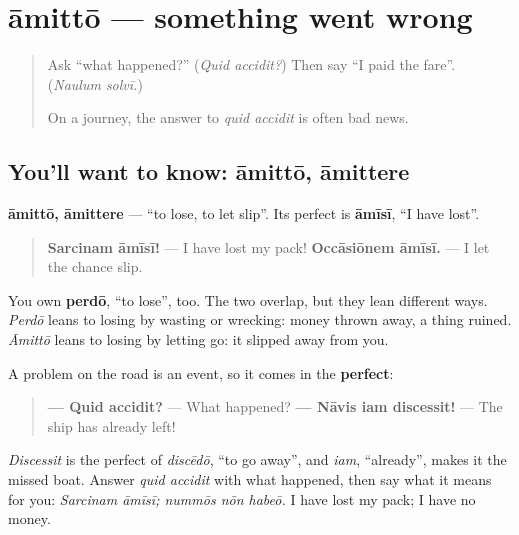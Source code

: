 \section[āmittō, āmittere]{āmittō — something went wrong}

\label{lesson:LA-C286-amitto}



\begin{quote}
Ask \textquotedblleft{}what happened?\textquotedblright{} (\emph{Quid accidit?}) Then say \textquotedblleft{}I paid the fare\textquotedblright{}. (\emph{Naulum solvī.})

On a journey, the answer to \emph{quid accidit} is often bad news.
\end{quote}

\subsection*{You'll want to know: āmittō, āmittere}
\textbf{āmittō, āmittere} — \textquotedblleft{}to lose, to let slip\textquotedblright{}. Its perfect is \textbf{āmīsī}, \textquotedblleft{}I have lost\textquotedblright{}.

\begin{quote}
\textbf{Sarcinam āmīsī!} — I have lost my pack! \textbf{Occāsiōnem āmīsī.} — I let the chance slip.
\end{quote}

You own \textbf{perdō}, \textquotedblleft{}to lose\textquotedblright{}, too. The two overlap, but they lean different ways. \emph{Perdō} leans to losing by wasting or wrecking: money thrown away, a thing ruined. \emph{Āmittō} leans to losing by letting go: it slipped away from you.

\begin{grammarlens}[title={Grammar Lens: reporting the problem}]
A problem on the road is an event, so it comes in the \textbf{perfect}:

\begin{quote}
\textbf{— Quid accidit?} — What happened? \textbf{— Nāvis iam discessit!} — The ship has already left!
\end{quote}

\emph{Discessit} is the perfect of \emph{discēdō}, \textquotedblleft{}to go away\textquotedblright{}, and \emph{iam}, \textquotedblleft{}already\textquotedblright{}, makes it the missed boat. Answer \emph{quid accidit} with what happened, then say what it means for you: \emph{Sarcinam āmīsī; nummōs nōn habeō.} I have lost my pack; I have no money.
\end{grammarlens}

